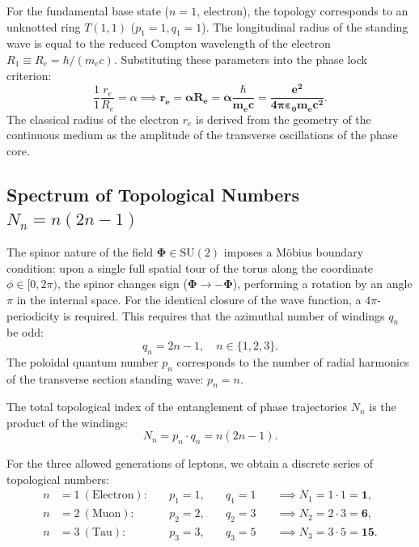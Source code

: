 \documentclass[12pt,a4paper]{article}
\begin{document}
	For the fundamental base state ($n=1$, electron), the topology corresponds to an unknotted ring $T(1,1)$ ($p_1 = 1, q_1 = 1$). The longitudinal radius of the standing wave is equal to the reduced Compton wavelength of the electron $R_1 \equiv R_e = \hbar / (m_e c)$. Substituting these parameters into the phase lock criterion:
	\begin{equation}
		\frac{1}{1} \frac{r_e}{R_e} = \alpha \implies \mathbf{r_e = \alpha R_e = \alpha \frac{\hbar}{m_e c} = \frac{e^2}{4\pi\varepsilon_0 m_e c^2}}.
	\end{equation}
	The classical radius of the electron $r_e$ is derived from the geometry of the continuous medium as the amplitude of the transverse oscillations of the phase core.
	
	\subsection{Spectrum of Topological Numbers $N_n = n(2n-1)$}
	The spinor nature of the field $\boldsymbol{\Phi} \in \mathrm{SU}(2)$ imposes a Möbius boundary condition: upon a single full spatial tour of the torus along the coordinate $\phi \in [0, 2\pi)$, the spinor changes sign ($\boldsymbol{\Phi} \to -\boldsymbol{\Phi}$), performing a rotation by an angle $\pi$ in the internal space. For the identical closure of the wave function, a $4\pi$-periodicity is required. This requires that the azimuthal number of windings $q_n$ be odd:
	\begin{equation}
		q_n = 2n - 1, \quad n \in \{1, 2, 3\}.
	\end{equation}
	The poloidal quantum number $p_n$ corresponds to the number of radial harmonics of the transverse section standing wave: $p_n = n$.
	
	The total topological index of the entanglement of phase trajectories $N_n$ is the product of the windings:
	\begin{equation}
		N_n = p_n \cdot q_n = n(2n - 1).
	\end{equation}
	
	For the three allowed generations of leptons, we obtain a discrete series of topological numbers:
	\begin{align}
	n &= 1 \ (\text{Electron}): \quad &p_1 = 1, \quad &q_1 = 1 \quad &\implies N_1 = 1 \cdot 1 = \mathbf{1}, \\
	n &= 2 \ (\text{Muon}):     \quad &p_2 = 2, \quad &q_2 = 3 \quad &\implies N_2 = 2 \cdot 3 = \mathbf{6}, \\
	n &= 3 \ (\text{Tau}):      \quad &p_3 = 3, \quad &q_3 = 5 \quad &\implies N_3 = 3 \cdot 5 = \mathbf{15}.
	\end{align}
	
\end{document}
